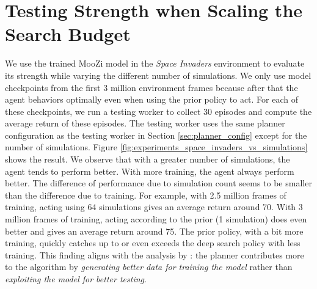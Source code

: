 
\section{Testing Strength when Scaling the Search Budget}
We use the trained MooZi model in the \textit{Space Invaders} environment to evaluate its strength while varying the different number of simulations.
We only use model checkpoints from the first 3 million environment frames because after that the agent behaviors optimally even when using the prior policy to act.
For each of these checkpoints, we run a testing worker to collect 30 episodes and compute the average return of these episodes.
The testing worker uses the same planner configuration as the testing worker in Section \ref{sec:planner_config} except for the number of simulations.
Figure \ref{fig:experiments_space_invaders_vs_simulations} shows the result.
We observe that with a greater number of simulations, the agent tends to perform better.
With more training, the agent always perform better.
The difference of performance due to simulation count seems to be smaller than the difference due to training.
For example, with 2.5 million frames of training, acting using 64 simulations gives an average return around 70.
With 3 million frames of training, acting according to the prior (1 simulation) does even better and gives an average return around 75.
The prior policy, with a bit more training, quickly catches up to or even exceeds the deep search policy with less training.
This finding aligns with the analysis by \citeauthor{ROLEPLANNINGMODELBASED_Hamrick.Friesen.ea_2021} \cite{ROLEPLANNINGMODELBASED_Hamrick.Friesen.ea_2021}:
the planner contributes more to the algorithm by \textit{generating better data for training the model} rather than \textit{exploiting the model for better testing}.


